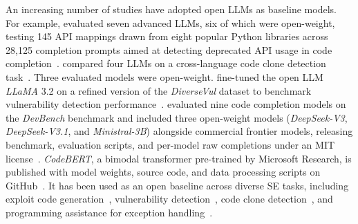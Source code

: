 \documentclass[smallextended]{svjour3}
\begin{document}
An increasing number of studies have adopted open LLMs as baseline models.
For example, \citeauthor{DBLP:journals/corr/abs-2406-09834} evaluated seven advanced LLMs, six of which were open-weight, testing 145 API mappings drawn from eight popular Python libraries across 28,125 completion prompts aimed at detecting deprecated API usage in code completion~\cite{DBLP:journals/corr/abs-2406-09834}.
\citeauthor{DBLP:journals/corr/abs-2408-04430} compared four LLMs on a cross-language code clone detection task~\cite{DBLP:journals/corr/abs-2408-04430}.
Three evaluated models were open-weight.
\citeauthor{DBLP:conf/eicc/GoncalvesSC0MPS25} fine-tuned the open LLM \emph{LLaMA} 3.2 on a refined version of the \emph{DiverseVul} dataset to benchmark vulnerability detection performance~\cite{DBLP:conf/eicc/GoncalvesSC0MPS25}.
\citeauthor{DBLP:journals/corr/abs-2601-11895} evaluated nine code completion models on the \emph{DevBench} benchmark and included three open-weight models (\emph{DeepSeek-V3}, \emph{DeepSeek-V3.1}, and \emph{Ministral-3B}) alongside commercial frontier models, releasing benchmark, evaluation scripts, and per-model raw completions under an MIT license~\cite{DBLP:journals/corr/abs-2601-11895}.
\emph{CodeBERT}, a bimodal transformer pre-trained by Microsoft Research, is published with model weights, source code, and data processing scripts on GitHub~\cite{codebert}. It has been used as an open baseline across diverse SE tasks, including exploit code generation~\cite{DBLP:journals/jss/YangZCZHC23}, vulnerability detection~\cite{DBLP:conf/gaiis/XiaSD24}, code clone detection~\cite{DBLP:conf/kbse/SonnekalbGBM22}, and programming assistance for exception handling~\cite{DBLP:conf/icse/CaiYMMN24}.
\end{document}
